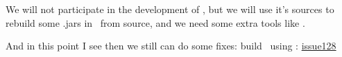 \clearpage
{}\secdown

We will not participate in the development of \hgdb{}, but we will use it's sources to rebuild some .jars
in \seco\ from source, and we need some extra tools like \hgv. 




And in this point I see then we still can do some fixes: build \hgdb\ using
\make: \href{https://github.com/hypergraphdb/hypergraphdb/issues/128}{issue128}

 

\secup